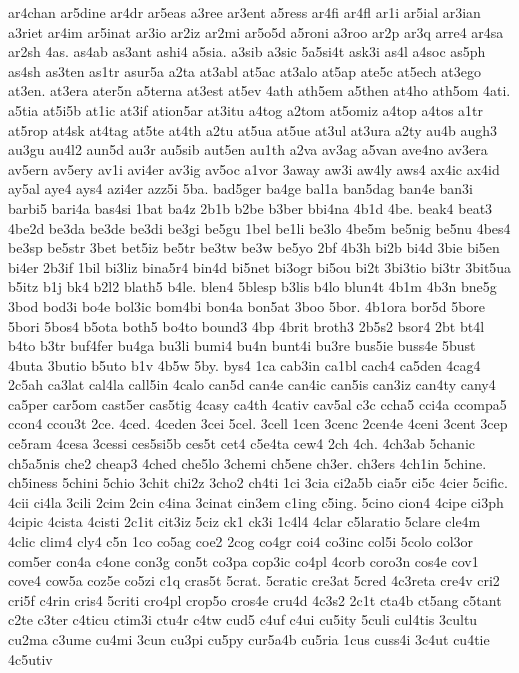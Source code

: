 {ar4chan
ar5dine
ar4dr
ar5eas
a3ree
ar3ent
a5ress
ar4fi
ar4fl
ar1i
ar5ial
ar3ian
a3riet
ar4im
ar5inat
ar3io
ar2iz
ar2mi
ar5o5d
a5roni
a3roo
ar2p
ar3q
arre4
ar4sa
ar2sh
4as.
as4ab
as3ant
ashi4
a5sia.
a3sib
a3sic
5a5si4t
ask3i
as4l
a4soc
as5ph
as4sh
as3ten
as1tr
asur5a
a2ta
at3abl
at5ac
at3alo
at5ap
ate5c
at5ech
at3ego
at3en.
at3era
ater5n
a5terna
at3est
at5ev
4ath
ath5em
a5then
at4ho
ath5om
4ati.
a5tia
at5i5b
at1ic
at3if
ation5ar
at3itu
a4tog
a2tom
at5omiz
a4top
a4tos
a1tr
at5rop
at4sk
at4tag
at5te
at4th
a2tu
at5ua
at5ue
at3ul
at3ura
a2ty
au4b
augh3
au3gu
au4l2
aun5d
au3r
au5sib
aut5en
au1th
a2va
av3ag
a5van
ave4no
av3era
av5ern
av5ery
av1i
avi4er
av3ig
av5oc
a1vor
3away
aw3i
aw4ly
aws4
ax4ic
ax4id
ay5al
aye4
ays4
azi4er
azz5i
5ba.
bad5ger
ba4ge
bal1a
ban5dag
ban4e
ban3i
barbi5
bari4a
bas4si
1bat
ba4z
2b1b
b2be
b3ber
bbi4na
4b1d
4be.
beak4
beat3
4be2d
be3da
be3de
be3di
be3gi
be5gu
1bel
be1li
be3lo
4be5m
be5nig
be5nu
4bes4
be3sp
be5str
3bet
bet5iz
be5tr
be3tw
be3w
be5yo
2bf
4b3h
bi2b
bi4d
3bie
bi5en
bi4er
2b3if
1bil
bi3liz
bina5r4
bin4d
bi5net
bi3ogr
bi5ou
bi2t
3bi3tio
bi3tr
3bit5ua
b5itz
b1j
bk4
b2l2
blath5
b4le.
blen4
5blesp
b3lis
b4lo
blun4t
4b1m
4b3n
bne5g
3bod
bod3i
bo4e
bol3ic
bom4bi
bon4a
bon5at
3boo
5bor.
4b1ora
bor5d
5bore
5bori
5bos4
b5ota
both5
bo4to
bound3
4bp
4brit
broth3
2b5s2
bsor4
2bt
bt4l
b4to
b3tr
buf4fer
bu4ga
bu3li
bumi4
bu4n
bunt4i
bu3re
bus5ie
buss4e
5bust
4buta
3butio
b5uto
b1v
4b5w
5by.
bys4
1ca
cab3in
ca1bl
cach4
ca5den
4cag4
2c5ah
ca3lat
cal4la
call5in
4calo
can5d
can4e
can4ic
can5is
can3iz
can4ty
cany4
ca5per
car5om
cast5er
cas5tig
4casy
ca4th
4cativ
cav5al
c3c
ccha5
cci4a
ccompa5
ccon4
ccou3t
2ce.
4ced.
4ceden
3cei
5cel.
3cell
1cen
3cenc
2cen4e
4ceni
3cent
3cep
ce5ram
4cesa
3cessi
ces5si5b
ces5t
cet4
c5e4ta
cew4
2ch
4ch.
4ch3ab
5chanic
ch5a5nis
che2
cheap3
4ched
che5lo
3chemi
ch5ene
ch3er.
ch3ers
4ch1in
5chine.
ch5iness
5chini
5chio
3chit
chi2z
3cho2
ch4ti
1ci
3cia
ci2a5b
cia5r
ci5c
4cier
5cific.
4cii
ci4la
3cili
2cim
2cin
c4ina
3cinat
cin3em
c1ing
c5ing.
5cino
cion4
4cipe
ci3ph
4cipic
4cista
4cisti
2c1it
cit3iz
5ciz
ck1
ck3i
1c4l4
4clar
c5laratio
5clare
cle4m
4clic
clim4
cly4
c5n
1co
co5ag
coe2
2cog
co4gr
coi4
co3inc
col5i
5colo
col3or
com5er
con4a
c4one
con3g
con5t
co3pa
cop3ic
co4pl
4corb
coro3n
cos4e
cov1
cove4
cow5a
coz5e
co5zi
c1q
cras5t
5crat.
5cratic
cre3at
5cred
4c3reta
cre4v
cri2
cri5f
c4rin
cris4
5criti
cro4pl
crop5o
cros4e
cru4d
4c3s2
2c1t
cta4b
ct5ang
c5tant
c2te
c3ter
c4ticu
ctim3i
ctu4r
c4tw
cud5
c4uf
c4ui
cu5ity
5culi
cul4tis
3cultu
cu2ma
c3ume
cu4mi
3cun
cu3pi
cu5py
cur5a4b
cu5ria
1cus
cuss4i
3c4ut
cu4tie
4c5utiv
}
